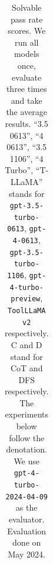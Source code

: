 \begin{table}[t!]
{\begin{tabular}{lccccccc}
         \bottomrule
    \end{tabular}
    }
    \caption{Solvable pass rate scores. We run all models once, evaluate three times and take the average results. ``3.5 0613'', ``4 0613'', ``3.5 1106'', ``4 Turbo'', ``T-LLaMA'' stands for \texttt{gpt-3.5-turbo-0613}, \texttt{gpt-4-0613}, \texttt{gpt-3.5-turbo-1106}, \texttt{gpt-4-turbo-preview}, 
    \texttt{ToolLLaMA v2} respectively. C and D stand for CoT and DFS respectively. The experiments below follow the denotation. We use \texttt{gpt-4-turbo-2024-04-09} as the evaluator. Evaluation done on May 2024.}
    \label{tab:main_sopr}
\end{table}




    


